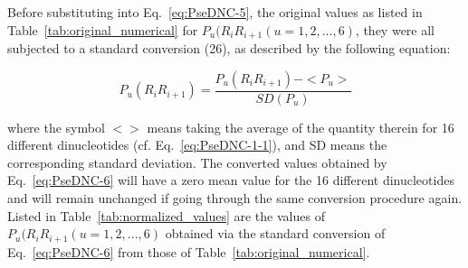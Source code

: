 Before substituting into Eq.~\ref{eq:PseDNC-5}, the original values as listed in Table~\ref{tab:original_numerical} for $P_{u}(R_{i}R_{i+1} (u = 1,2,...,6)$⁠, they were all subjected to a standard conversion (26), as described by the following equation:

\begin{equation}\label{eq:PseDNC-6}
    P_{u}(R_{i}R_{i+1}) = \frac{P_{u}(R_{i}R_{i+1}) - <P_{u}>}{SD(P_{u})}
\end{equation}

where the symbol $<>$ means taking the average of the quantity therein for 16 different dinucleotides (cf. Eq.~\ref{eq:PseDNC-1-1}), and SD means the corresponding standard deviation. The converted values obtained by Eq.~\ref{eq:PseDNC-6} will have a zero mean value for the 16 different dinucleotides and will remain unchanged if going through the same conversion procedure again. Listed in Table~\ref{tab:normalized_values} are the values of $P_{u}(R_{i}R_{i+1} (u = 1,2,...,6)$ obtained via the standard conversion of Eq.~\ref{eq:PseDNC-6} from those of Table~\ref{tab:original_numerical}.

